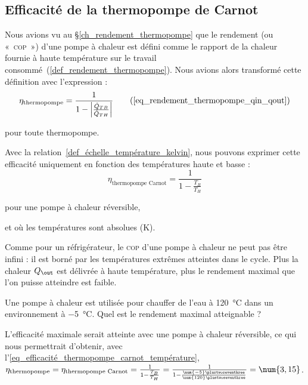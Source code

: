 	\subsection{Efficacité de la thermopompe de Carnot}

		Nous avions vu au \S\ref{ch_rendement_thermopompe} que le rendement (ou «~\textsc{cop}~») d’une pompe à chaleur est défini comme le rapport de la chaleur fournie à haute température sur le travail consommé~(\ref{def_rendement_thermopompe}). Nous avions alors transformé cette définition avec l’expression :
		\begin{equation}
			\eta_\text{thermopompe} = \frac{1}{1 - \left| \frac{\dot Q_{TB}}{\dot Q_{TH}} \right|} \tag{\ref{eq_rendement_thermopompe_qin_qout}}
		\end{equation}
		\begin{equationterms}
			\item pour toute thermopompe.
		\end{equationterms}

		Avec la relation~\ref{def_échelle_température_kelvin}, nous pouvons exprimer cette efficacité uniquement en fonction des températures haute et basse :
		\begin{equation}
			\eta_\text{thermopompe Carnot} = \frac{1}{1 - \frac{T_B}{T_H}}
			\label{eq_efficacité_thermopompe_carnot_température}
		\end{equation}
		\begin{equationterms}
			\item pour une pompe à chaleur réversible,
			\item et où les températures sont absolues (\si{\kelvin}).
		\end{equationterms}

		Comme pour un réfrigérateur, le \textsc{cop} d’une pompe à chaleur ne peut pas être infini : il est borné par les températures extrêmes atteintes dans le cycle. Plus la chaleur $Q_\out$ est délivrée à haute température, plus le rendement maximal que l’on puisse atteindre est faible.
		
		\begin{anexample}
		 	Une pompe à chaleur est utilisée pour chauffer de l’eau à \SI{120}{\degreeCelsius} dans un environnement à \SI{-5}{\degreeCelsius}. Quel est le rendement maximal atteignable ?
		 		\begin{answer}
		 			L’efficacité maximale serait atteinte avec une pompe à chaleur réversible, ce qui nous permettrait d’obtenir, avec l’\cref{eq_efficacité_thermopompe_carnot_température}, $\eta_\text{thermopompe} = \eta_\text{thermopompe Carnot} = \frac{1}{1 - \frac{T_B}{T_H}} = \frac{1}{1 - \frac{\num{-5}\plustwoseventhree}{\num{120}\plustwoseventhree}} = \num{3,15}$.
		 		\end{answer}
		 \end{anexample}
